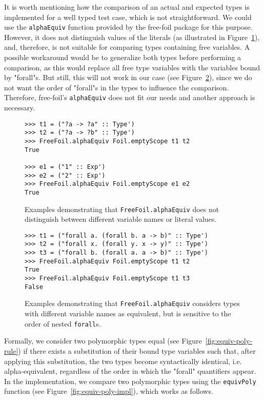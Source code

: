 It is worth mentioning how the comparison of an actual and expected types is implemented for a well typed test case, which is not straightforward. We could use the \texttt{alphaEquiv} function provided by the free-foil package for this purpose. However, it does not distinguish values of the literals (as illustrated in Figure~\ref{fig:freefoil-alphaequiv-literals}), and, therefore, is not suitable for comparing types containing free variables. A possible workaround would be to generalize both types before performing a comparison, as this would replace all free type variables with the variables bound by "forall"s. But still, this will not work in our case (see Figure~\ref{fig:freefoil-alphaequiv-foralls}), since we do not want the order of "forall"s in the types to influence the comparison. Therefore, free-foil's \texttt{alphaEquiv} does not fit our needs and another approach is necessary.

\begin{figure}[H]
  \begin{verbatim}
>>> t1 = ("?a -> ?a" :: Type')
>>> t2 = ("?a -> ?b" :: Type')
>>> FreeFoil.alphaEquiv Foil.emptyScope t1 t2
True

>>> e1 = ("1" :: Exp')
>>> e2 = ("2" :: Exp')
>>> FreeFoil.alphaEquiv Foil.emptyScope e1 e2
True
  \end{verbatim}
  \caption[\texttt{FreeFoil.alphaEquiv} usage examples (1)]{Examples demonstrating that \texttt{FreeFoil.alphaEquiv} does not distinguish between different variable names or literal values.}
  \label{fig:freefoil-alphaequiv-literals}
\end{figure}

\begin{figure}[H]
  \begin{verbatim}
>>> t1 = ("forall a. (forall b. a -> b)" :: Type')
>>> t2 = ("forall x. (forall y. x -> y)" :: Type')
>>> t3 = ("forall b. (forall a. a -> b)" :: Type')
>>> FreeFoil.alphaEquiv Foil.emptyScope t1 t2
True
>>> FreeFoil.alphaEquiv Foil.emptyScope t1 t3
False
  \end{verbatim}
  \caption[\texttt{FreeFoil.alphaEquiv} usage examples (2)]{Examples demonstrating that \texttt{FreeFoil.alphaEquiv} considers types with different variable names as equivalent, but is sensitive to the order of nested \texttt{forall}s.}
  \label{fig:freefoil-alphaequiv-foralls}
\end{figure}

Formally, we consider two polymorphic types equal (see Figure~\ref{fig:equiv-poly-rule}) if there exists a substitution of their bound type variables such that, after applying this substitution, the two types become syntactically identical, i.e. alpha-equivalent, regardless of the order in which the "forall" quantifiers appear. In the implementation, we compare two polymorphic types using the \texttt{equivPoly} function (see Figure~\ref{fig:equiv-poly-impl}), which works as follows.

